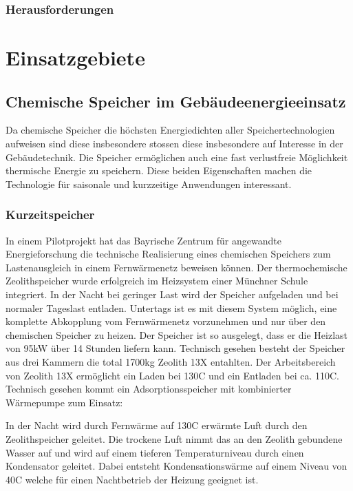 \documentclass[11pt,a4paper]{scrartcl}
\begin{document}
\subsubsection{Herausforderungen}


\newpage
\section{Einsatzgebiete}
\subsection{Chemische Speicher im Gebäudeenergieeinsatz}
Da chemische Speicher die höchsten Energiedichten aller Speichertechnologien
aufweisen sind diese insbesondere stossen diese insbesondere auf Interesse in
der Gebäudetechnik. Die Speicher ermöglichen auch eine fast verlustfreie
Möglichkeit thermische Energie zu speichern. Diese beiden Eigenschaften machen
die Technologie für saisonale und kurzzeitige Anwendungen interessant.

\subsubsection{Kurzeitspeicher}

In einem Pilotprojekt hat das Bayrische Zentrum für angewandte Energieforschung
die technische Realisierung eines chemischen Speichers zum Lastenausgleich in
einem Fernwärmenetz beweisen können. Der thermochemische Zeolithspeicher wurde
erfolgreich im Heizsystem einer Münchner Schule integriert. In der Nacht bei
geringer Last wird der Speicher aufgeladen und bei normaler Tageslast entladen.
Untertags ist es mit diesem System möglich, eine komplette Abkopplung vom
Fernwärmenetz vorzunehmen und nur über den chemischen Speicher zu heizen. Der
Speicher ist so ausgelegt, dass er die Heizlast von 95kW über 14 Stunden liefern
kann. Technisch gesehen besteht der Speicher aus drei Kammern die total 1700kg
Zeolith 13X entahlten. Der Arbeitsbereich von Zeolith 13X ermöglicht ein Laden
bei 130\textdegree C und ein Entladen bei ca. 110\textdegree C. Technisch
gesehen kommt ein Adsorptionsspeicher mit kombinierter Wärmepumpe zum Einsatz:

In der Nacht wird durch Fernwärme auf 130\textdegree C erwärmte Luft durch den
Zeolithspeicher geleitet. Die trockene Luft nimmt das an den Zeolith gebundene
Wasser auf und wird auf einem tieferen Temperaturniveau durch einen Kondensator
geleitet. Dabei entsteht Kondensationswärme auf einem Niveau von 40\textdegree C
welche für einen Nachtbetrieb der Heizung geeignet ist. 
\end{document}

